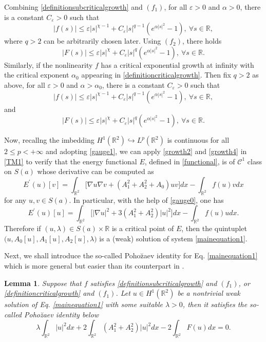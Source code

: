 \documentclass[11pt]{amsart}
\numberwithin{equation}{section}
\newtheorem{lemma}[theorem]{Lemma}
\theoremstyle{definition}
\newcommand{\R}{\mathbb{R}}
\begin{document}
Combining \eqref{definitionsubcriticalgrowth} and $(f_1)$,
for all $\varepsilon>0$ and $\alpha>0$, there is a constant $C_\varepsilon>0$ such that
\begin{equation}\label{growth1}
  |f(s)|\leq \varepsilon |s|^{\chi-1}+C_\varepsilon|s|^{q-1}(e^{\alpha |s|^2}-1),~\forall s\in\R,
\end{equation}
where $q>2$ can be arbitrarily chosen later. Using $(f_2)$, there holds
\begin{equation}\label{growth2}
  |F(s)|\leq \varepsilon |s|^{\chi }+C_\varepsilon|s|^{q }(e^{\alpha |s|^2}-1),~\forall s\in\R.
\end{equation}
Similarly, if the nonlinearity $f$ has a critical exponential growth at infinity with the critical exponent $\alpha_0$
appearing in \eqref{definitioncriticalgrowth}. Then fix $q>2$ as above,
for all $\varepsilon>0$ and $\alpha>\alpha_0$, there is a constant $C_\varepsilon>0$ such that
\begin{equation}\label{growth3}
  |f(s)|\leq \varepsilon |s|^{\chi-1}+C_\varepsilon|s|^{q-1}(e^{\alpha |s|^2}-1),~\forall s\in\R,
\end{equation}
and
\begin{equation}\label{growth4}
  |F(s)|\leq \varepsilon |s|^{\chi }+C_\varepsilon|s|^{q }(e^{\alpha |s|^2}-1),~\forall s\in\R.
\end{equation}


Now, recallng the imbedding $H^1(\R^2)\hookrightarrow L^p(\R^2)$ is continuous for all $2\leq p<+\infty$
and adopting \eqref{gauge1}, we can apply \eqref{growth2} and \eqref{growth4}
in \eqref{TM1} to verify that the energy functional $E$, defined in \eqref{functional},
is of $\mathcal{C}^1$ class on $S(a)$ whose derivative can be computed as
\[
E^\prime(u)[v]=
\int_{\R^2} \big[\nabla u \nabla v
+(A_1^2+A_2^2+A_0)uv\big]dx - \int_{\R^2}f( u)vdx
\]
for any $u,v\in S(a)$. In particular, with the help of \eqref{gauge0}, one has
\[
E^\prime(u)[u]= \int_{\R^2}\big[|\nabla u|^2 +3(A_1^2+A_2^2)|u|^2\big]dx
- \int_{\R^2}f(u)udx.
\]
Therefore if $(u,\lambda)\in S(a)\times\R$ is a critical point of $E$, then the
quintuplet $\big(u,A_0[u],A_1[u],A_2[u],\lambda\big)$ is a (weak)
 solution of system \eqref{mainequation1}.

Next, we shall introduce the so-called Poho\u{z}aev identity for Eq. \eqref{mainequation1}
which is more general but easier than its counterpart in \cite[Propostion 2.3]{Byeon}.


\begin{lemma}\label{Pohozaev}
Suppose that $f$ satisfies \eqref{definitionsubcriticalgrowth} and $(f_1)$, or
\eqref{definitioncriticalgrowth} and $(f_1)$. Let $u\in H^1(\R^2)$ be a
nontrivial weak solution of Eq. \eqref{mainequation1} with some suitable $\lambda>0$,
then it satisfies the so-called Poho\u{z}aev identity below
\begin{equation}\label{Pohozaev1}
 \lambda\int_{\R^2}|u|^2dx
 +2\int_{\R^2}(A_1^2+A_2^2)|u|^2dx-2\int_{\R^2}F(u)dx
=0.
\end{equation}
\end{lemma}
\end{document}
